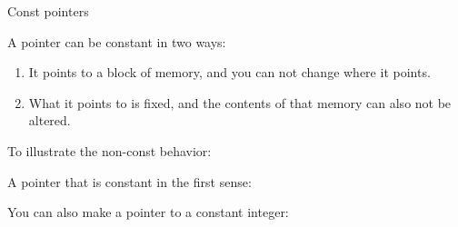  {Const pointers}

A pointer can be constant in two ways:
\begin{enumerate}
\item It points to a block of memory, and you can not change where
  it points.
\item What it points to is fixed, and the contents of that memory can
  also not be altered.
\end{enumerate}

To illustrate the non-const behavior:
%

A pointer that is constant in the first sense:
%

You can also make a pointer to a constant integer:
%

